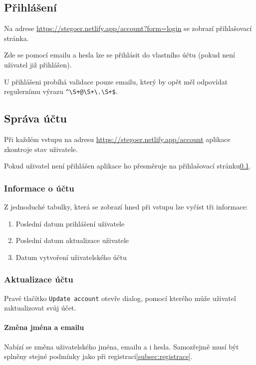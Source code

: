 \subsection{Přihlášení}\label{subsec:prihlaseni}
Na adrese \url{https://stegoer.netlify.app/account?form=login} se zobrazí
přihlašovací stránka.

Zde se pomocí emailu a hesla lze se přihlásit do vlastního účtu (pokud není
uživatel již přihlášen).

U přihlášeni probíhá validace pouze emailu, který by opět měl odpovídat
regulernímu výrazu \verb/^\S+@\S+\.\S+$/.

\subsection{Správa účtu}\label{subsec:sprava-uctu}
Při každém vstupu na adresu \url{https://stegoer.netlify.app/account} aplikace
zkontroje stav uživatele.

Pokud uživatel není přihlášen aplikace ho přesměruje na přihlašovací
stránku\ref{subsec:prihlaseni}.

\subsubsection{Informace o účtu}

Z jednoduché tabulky, která se zobrazí hned při vstupu lze vyčíst tři informace:

\begin{enumerate}
    \item Poslední datum prihlášení uživatele
    \item Poslední datum aktualizace uživatele
    \item Datum vytvoření uživatelského účtu
\end{enumerate}

\subsubsection{Aktualizace účtu}

Pravé tlačítko \texttt{Update account} otevře dialog, pomocí kterého může
uživatel zaktualizovat svůj účet.

\paragraph{Změna jména a emailu}

Nabízí se změna uživatelského jména, emailu a i hesla.
Samozřejmě musí být splněny stejné podmínky jako při
registraci\ref{subsec:registrace}.

